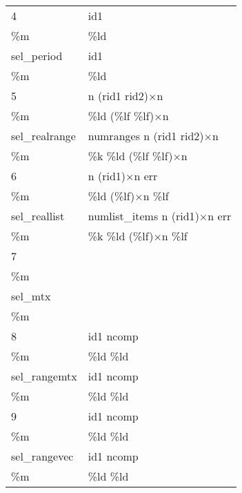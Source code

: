 \begin{table}[!p]
\begin{center}
\begin{tabular}{||l|l||}
\hline
\hline

4                 &  {\sf id1}   \\
{\sf \%m}         &  {\sf \%ld} \\
\cline{1-2}
{\sf sel\_period} &  {\sf id1}   \\
{\sf \%m}         &  {\sf \%ld} \\

\hline
\hline

5                    & {\sf n} ({\sf rid1} {\sf rid2})$\times${\sf n}  \\
{\sf \%m}            & {\sf \%ld} ({\sf \%lf \%lf})$\times${\sf n}      \\
\cline{1-2}
{\sf sel\_realrange} & {\sf numranges} {\sf n} ({\sf rid1} {\sf rid2})$\times${\sf n}  \\
{\sf \%m}            & {\sf \%k \%ld} ({\sf \%lf \%lf})$\times${\sf n}      \\

\hline
\hline

6                   & {\sf n} ({\sf rid1})$\times${\sf n} {\sf err} \\
{\sf \%m}           & {\sf \%ld} ({\sf \%lf})$\times${\sf n} {\sf \%lf}  \\
\cline{1-2}
{\sf sel\_reallist} & {\sf numlist\_items } {\sf n} ({\sf rid1})$\times${\sf n} {\sf err} \\
{\sf \%m}           & {\sf \%k \%ld} ({\sf \%lf})$\times${\sf n} {\sf \%lf}  \\

\hline
\hline

7              & \\
{\sf \%m}      & \\
\cline{1-2}
{\sf sel\_mtx} & \\
{\sf \%m}      & \\

\hline
\hline

8                   & {\sf id1} {\sf ncomp}  \\
{\sf \%m}           & {\sf \%ld \%ld} \\
\cline{1-2}
{\sf sel\_rangemtx} & {\sf id1} {\sf ncomp}\\
{\sf \%m}           & {\sf \%ld \%ld}\\

\hline
\hline

9                           &  {\sf id1}  {\sf ncomp} \\
{\sf \%m}                   &  {\sf \%ld \%ld}     \\
\cline{1-2}
{\sf sel\_rangevec}         &  {\sf id1} {\sf ncomp}  \\
{\sf \%m}                   &  {\sf \%ld \%ld}     \\


\end{tabular}
\end{center}
\end{table}
